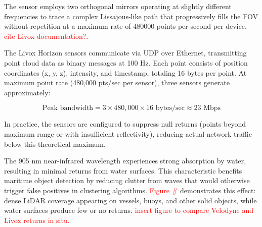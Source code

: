 \documentclass{erauthesis}
\begin{document}
The sensor employs two orthogonal mirrors operating at slightly different frequencies to trace a complex Lissajous-like path that progressively fills the \ac{FOV} without repetition at a maximum rate of $480000$ points per second per device.
\textcolor{red}{cite Livox documentation?}.

The Livox Horizon sensors communicate via \ac{UDP} over Ethernet, transmitting point cloud data as binary messages at 100 Hz.
Each point consists of position coordinates (x, y, z), intensity, and timestamp, totaling 16 bytes per point.
At maximum point rate (480,000 pts/sec per sensor), three sensors generate approximately:

$$\text{Peak bandwidth} = 3 \times 480,000 \times 16 \text{ bytes/sec} \approx 23 \text{ Mbps}$$

In practice, the sensors are configured to suppress null returns (points beyond maximum range or with insufficient reflectivity), reducing actual network traffic below this theoretical maximum.

The 905 nm near-infrared wavelength experiences strong absorption by water, resulting in minimal returns from water surfaces.
This characteristic benefits maritime object detection by reducing clutter from waves that would otherwise trigger false positives in clustering algorithms.
\textcolor{red}{Figure \#} demonstrates this effect: dense \ac{LiDAR} coverage appearing on vessels, buoys, and other solid objects, while water surfaces produce few or no returns.
\textcolor{red}{insert figure to compare Velodyne and Livox returns in situ.}


\end{document}
